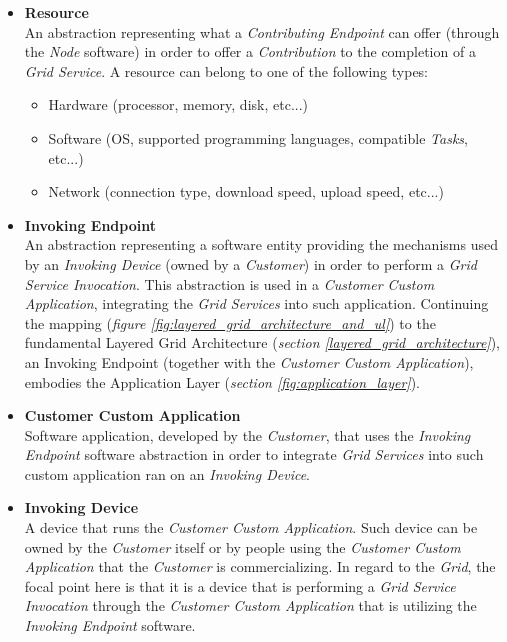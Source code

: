 \begin{itemize}
    \item \textbf{Resource}\label{resource}\\
    An abstraction representing what a \textit{Contributing Endpoint} can offer (through the \textit{Node} software) in order to offer a \textit{Contribution} to the completion of a \textit{Grid Service}. A resource can belong to one of the following types:
    \begin{itemize}
        \item Hardware (processor, memory, disk, etc...)
        \item Software (OS, supported programming languages, compatible \textit{Tasks}, etc...)
        \item Network (connection type, download speed, upload speed, etc...)
    \end{itemize}
    \item \textbf{Invoking Endpoint}\label{invoking_endpoint}\\
    An abstraction representing a software entity providing the mechanisms used by an \textit{Invoking Device} (owned by a \textit{Customer}) in order to perform a \textit{Grid Service Invocation}. This abstraction is used in a \textit{Customer Custom Application}, integrating the \textit{Grid Services} into such application. Continuing the mapping (\textit{figure \ref{fig:layered_grid_architecture_and_ul}}) to the fundamental Layered Grid Architecture (\textit{section \ref{layered_grid_architecture}}), an Invoking Endpoint (together with the \textit{Customer Custom Application}), embodies the Application Layer (\textit{section \ref{fig:application_layer}}).
    \item \textbf{Customer Custom Application}\label{customer_custom_application}\\
    Software application, developed by the \textit{Customer}, that uses the \textit{Invoking Endpoint} software abstraction in order to integrate \textit{Grid Services} into such custom application ran on an \textit{Invoking Device}.
    \item \textbf{Invoking Device}\label{invoking_device}\\
    A device that runs the \textit{Customer Custom Application}. Such device can be owned by the \textit{Customer} itself or by people using the \textit{Customer Custom Application} that the \textit{Customer} is commercializing. In regard to the \textit{Grid}, the focal point here is that it is a device that is performing a \textit{Grid Service Invocation} through the \textit{Customer Custom Application} that is utilizing the \textit{Invoking Endpoint} software.

\end{itemize}
